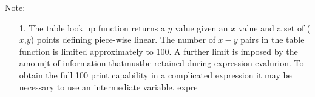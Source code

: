 Note:
\begin{enumerate}
\item[1.] The table look up function returns a $y$ value
given an $x$ value and a set of ($x$,$y$) points defining piece-wise linear.
The number of $x-y$ pairs in the table function is limited
approximately to 100.  A further limit is imposed by the amounjt of
information thatmustbe retained during expression evalurion.  To
obtain the full 100 print capability in a complicated expression it may be
necessary to use an intermediate variable.
expre

%
%
%
%
\end{enumerate}
\clearpage
